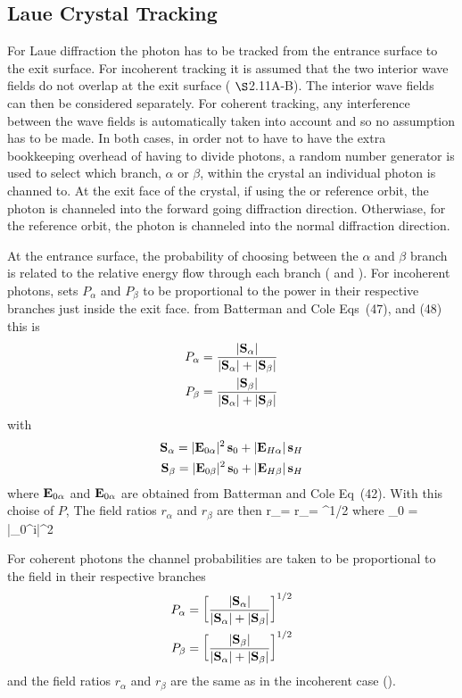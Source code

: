 \subsection{Laue Crystal Tracking}
\label{ss:laue.track}

For Laue diffraction the photon has to be tracked from the entrance
surface to the exit surface. For incoherent tracking it is assumed
that the two interior wave fields do not overlap at the exit surface
(\cite{b:batterman} $\S$2.11A-B). The interior wave fields can then be
considered separately. For coherent tracking, any interference between
the wave fields is automatically taken into account and so no
assumption has to be made. In both cases, in order not to have to have
the extra bookkeeping overhead of having to divide photons, a random
number generator is used to select which branch, $\alpha$ or $\beta$,
within the crystal an individual photon is channed to. At the exit
face of the crystal, if using the  or
 reference orbit, the photon is channeled into the
forward going diffraction direction. Otherwiase, for the
 reference orbit, the photon is channeled into
the normal diffraction direction.

At the entrance surface, the probability of choosing between the
$\alpha$ and $\beta$ branch is related to the relative energy flow
through each branch ( and ). For incoherent
photons, \bmad sets $P_\alpha$ and $P_\beta$ to be proportional to the
power in their respective branches just inside the exit face. from
Batterman and Cole\cite{b:batterman} Eqs~(47), and (48) this is
\begin{align}
  P_\alpha &= \frac{|{\bf S}_\alpha|}{|{\bf S}_\alpha| + |{\bf S}_\beta|} \nonumber \\
  P_\beta &= \frac{|{\bf S}_\beta|}{|{\bf S}_\alpha| + |{\bf S}_\beta|} 
\end{align}
with
\begin{align}
  {\bf S}_\alpha = |{\bf E}_{0\alpha}|^2 \, {\bf s}_0 + |{\bf E}_{H\alpha}| \, {\bf s}_H \nonumber \\
  {\bf S}_\beta = |{\bf E}_{0\beta}|^2 \, {\bf s}_0 + |{\bf E}_{H\beta}| \, {\bf s}_H 
\end{align}
where ${\bf E}_{0\alpha}$ and ${\bf E}_{0\alpha}$ are obtained from
Batterman and Cole Eq~(42). With this choise of $P$, The field ratios
$r_\alpha$ and $r_\beta$ are then
\Begineq
  r_\alpha = r_\beta = ^{1/2}
  \label{rrsss}
\Endeq
where
\Begineq
  \bfS_0 =  \,  \, |\bfE_0^i|^2 
\Endeq

For coherent photons the channel probabilities are taken to be proportional to the
field in their respective branches
\begin{align}
  P_\alpha &= \left[ \frac{|{\bf S}_\alpha|}{|{\bf S}_\alpha| + |{\bf S}_\beta|} \right]^{1/2} \nonumber \\
  P_\beta &= \left[ \frac{|{\bf S}_\beta|}{|{\bf S}_\alpha| + |{\bf S}_\beta|} \right]^{1/2}
\end{align}
and the field ratios $r_\alpha$ and $r_\beta$ are the same as in the
incoherent case ().

